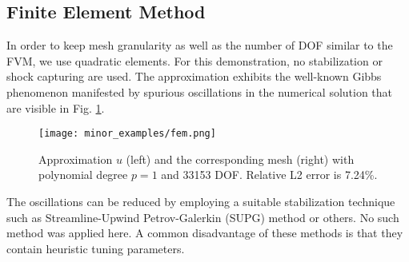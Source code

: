 \subsection{Finite Element Method}
In order to keep mesh granularity as well as the number of DOF similar to the FVM, we use quadratic elements. For
this demonstration, no stabilization or shock capturing are used. The approximation exhibits the well-known Gibbs 
phenomenon \cite{compress} manifested by spurious oscillations 
in the numerical solution that are visible in Fig. \ref{fig:fem000}.

\begin{figure}[H]
\begin{center}
\texttt{[image: minor\_examples/fem.png]}
\caption{Approximation $u$ (left) and the corresponding mesh (right) with polynomial degree $p = 1$ and 33153 DOF. 
Relative L2 error is 7.24\%.}
\label{fig:fem000}
\end{center}
\end{figure}
\noindent
The oscillations can be reduced by employing a suitable stabilization technique such as
Streamline-Upwind Petrov-Galerkin (SUPG) method \cite{SUPG} or others. No such method was applied here. A common disadvantage of these 
methods is that they contain heuristic tuning parameters. 

